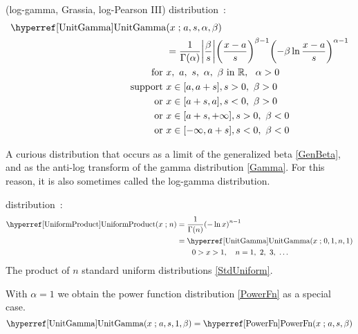 


\label{sec:UnitGamma}
 (log-gamma, Grassia, log-Pearson III) distribution~\cite{Olshen1938,Consul1971,Grassia1977,Gupta2004}:
\begin{align}
\label{UnitGamma}
\opr{UnitGamma}&(x\given a, s,\alpha,\beta) \\ \notag &= \frac{1}{\Gamma(\alpha)} \Left|\frac{\beta}{ s}\Right|
\Left(\frac{x-a}{s}\Right)^{\beta-1} \Left(-\beta \ln   \frac{x-a}{s} \Right)^{\alpha-1}  \checked
\notag
\\ \text{for }& x,\ a,\ s,\ \alpha,\ \beta \text{ in } \mathbb{R},\ \ \alpha >0
\notag
 \\ \text{ support } & x \in [a,a+s], s>0,\ \beta>0 \notag \\ \text{ or } &  x\in[a+s,a], s<0,\ \beta>0 
 \notag 
 \\  \notag  \text{ or } &  x\in[a+s,+\infty], s>0,\ \beta<0 
 \\  \notag  \text{ or } &  x\in[-\infty,a+s], s<0,\ \beta<0 
\end{align}

A curious distribution that occurs as a limit of the generalized beta \eqref{GenBeta}, and as the anti-log transform of the gamma distribution \eqref{Gamma}. For this reason, it is also sometimes called the log-gamma distribution.





 distribution~\cite{Springer1979a}:
\begin{align}
\label{UniformProduct}
\opr{UniformProduct}(x\given n) &=  \frac{1}{\Gamma(n)} \Left( -\ln x \Right)^{n-1} 	\checked
 \\ \notag & = \opr{UnitGamma}(x\given 0, 1,n,1)							\checked
 \\ \notag & \qquad 0>x>1, \quad n = 1,\ 2,\ 3,\ \ldots							\checked
\end{align}
The product of $n$ standard uniform distributions \eqref{StdUniform}.



With  $\alpha=1$ we obtain the power function distribution \eqref{PowerFn} as a special case.
\[
\opr{UnitGamma}(x\given a, s,1,\beta) = \opr{PowerFn}(x\given a,s,\beta) \checked \notag
\]


